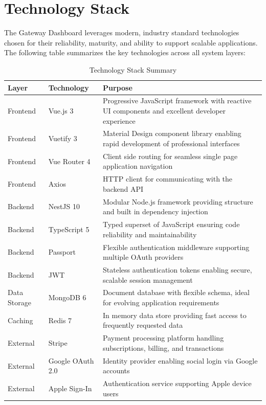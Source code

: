 \section{Technology Stack}
\label{sec:tech_stack}

The Gateway Dashboard leverages modern, industry standard technologies chosen for their reliability, maturity, and ability to support scalable applications. The following table summarizes the key technologies across all system layers:

\begin{table}[H]
\centering
\begin{tabular}{|l|l|p{8cm}|}
\hline
\textbf{Layer} & \textbf{Technology} & \textbf{Purpose} \\
\hline
Frontend & Vue.js 3 & Progressive JavaScript framework with reactive UI components and excellent developer experience \\
\hline
Frontend & Vuetify 3 & Material Design component library enabling rapid development of professional interfaces \\
\hline
Frontend & Vue Router 4 & Client side routing for seamless single page application navigation \\
\hline
Frontend & Axios & HTTP client for communicating with the backend API \\
\hline
Backend & NestJS 10 & Modular Node.js framework providing structure and built in dependency injection \\
\hline
Backend & TypeScript 5 & Typed superset of JavaScript ensuring code reliability and maintainability \\
\hline
Backend & Passport & Flexible authentication middleware supporting multiple OAuth providers \\
\hline
Backend & JWT & Stateless authentication tokens enabling secure, scalable session management \\
\hline
Data Storage & MongoDB 6 & Document database with flexible schema, ideal for evolving application requirements \\
\hline
Caching & Redis 7 & In memory data store providing fast access to frequently requested data \\
\hline
External & Stripe & Payment processing platform handling subscriptions, billing, and transactions \\
\hline
External & Google OAuth 2.0 & Identity provider enabling social login via Google accounts \\
\hline
External & Apple Sign-In & Authentication service supporting Apple device users \\
\hline
\end{tabular}
\caption{Technology Stack Summary}
\label{tab:tech_stack_summary}
\end{table}

